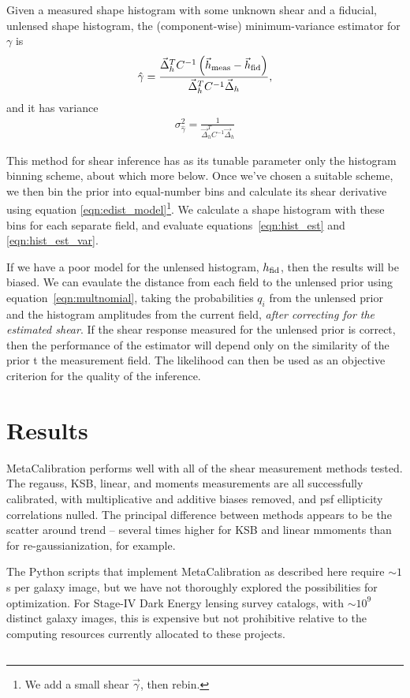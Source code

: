\documentclass[iop]{emulateapj}
\begin{document}
Given a measured shape histogram with some unknown shear and a fiducial, unlensed shape histogram, the (component-wise) minimum-variance estimator for $\gamma$ is
\begin{align}
\hat{\gamma} = \frac{\vec{\Delta}_h^T C^{-1}\left( \vec{h}_{\rm meas} - \vec{h}_{\rm fid}\right)} {\vec{\Delta}_h^TC^{-1}\vec{\Delta}_h},
\label{eqn:hist_est}
\end{align}
and it has variance
\begin{align}
\sigma^2_{\hat{\gamma}} = \frac{1}{\vec{\Delta}_h^TC^{-1}\vec{\Delta}_h}
\label{eqn:hist_est_var}
\end{align}

This method for shear inference has as its tunable parameter only the histogram binning scheme, about which more below. Once we've chosen a suitable scheme, we then bin the prior into equal-number bins and calculate its shear derivative using equation \ref{eqn:edist_model}\footnote{We add a small shear $\vec{\gamma}$, then rebin.}. We calculate a shape histogram with these bins for each separate field, and evaluate equations~\ref{eqn:hist_est} and \ref{eqn:hist_est_var}.

If we have a poor model for the unlensed histogram, $h_{\rm fid}$, then the results will be biased. We can evaulate the distance from each field to the unlensed prior using equation~\ref{eqn:multnomial}, taking the probabilities $q_i$ from the unlensed prior and the histogram amplitudes from the current field, {\it after correcting for the estimated shear}. If the shear response measured for the unlensed prior is correct, then the performance of the estimator will depend only on the similarity of the prior t the measurement field. The likelihood can then be used as an objective criterion for the quality of the inference. 

\section{Results}



MetaCalibration performs well with all of the shear measurement methods tested. The regauss, KSB, linear, and moments measurements are all successfully calibrated, with multiplicative and additive biases removed, and psf ellipticity correlations nulled. The principal difference between methods appears to be the scatter around trend -- several times higher for KSB and linear mmoments than for re-gaussianization, for example.

The Python scripts that implement MetaCalibration as described here require $\sim1$s per galaxy image, but we have not thoroughly explored the possibilities for optimization. For Stage-IV Dark Energy lensing survey catalogs, with $\sim10^9$ distinct galaxy images, this is expensive but not prohibitive relative to the computing resources currently allocated to these projects.

\subsection{}






\end{document}
